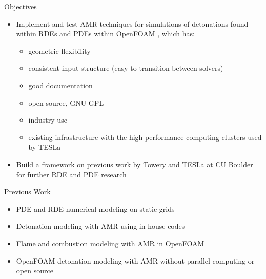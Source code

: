 \begin{frame}{Objectives}
\begin{itemize}
\item Implement and test AMR techniques for simulations of detonations found within RDEs and PDEs within OpenFOAM \cite{weller}, which has:
\begin{itemize}
\item geometric flexibility 
\item consistent input structure (easy to transition between solvers)
\item good documentation
\item open source, GNU GPL
\item industry use
\item existing infrastructure with the high-performance computing clusters used by TESLa
\end{itemize}
\item Build a framework on previous work by Towery \cite{towery1} and TESLa at CU Boulder for further RDE and PDE research 
\end{itemize}
\end{frame}

\begin{frame}{Previous Work}
\begin{itemize}
\item PDE and RDE numerical modeling on static grids 
\item Detonation modeling with AMR using in-house codes
\item Flame and combustion modeling with AMR in OpenFOAM
\item OpenFOAM detonation modeling with AMR without parallel computing or open source
\end{itemize}
\end{frame}

